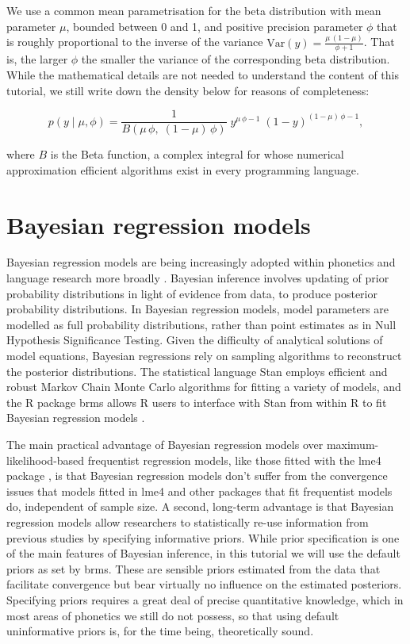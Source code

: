 \documentclass[
  authoryear,
  preprint,
  3p]{elsarticle}
\begin{document}
We use a common mean parametrisation for the beta distribution with mean
parameter \(\mu\), bounded between 0 and 1, and positive precision
parameter \(\phi\) that is roughly proportional to the inverse of the
variance \(\text{Var}(y) = \frac{\mu \, (1 - \mu)}{\phi + 1}\). That is,
the larger \(\phi\) the smaller the variance of the corresponding beta
distribution. While the mathematical details are not needed to
understand the content of this tutorial, we still write down the density
below for reasons of completeness:

\[
p(y \mid \mu, \phi) = \frac{1}{B(\mu \, \phi, \; (1-\mu) \, \phi)} \; y^{\mu \, \phi -1} \; (1-y)^{(1-\mu) \, \phi -1},
\]

where \(B\) is the Beta function, a complex integral for whose numerical
approximation efficient algorithms exist in every programming language.

\section{Bayesian regression models}\label{sec-bayes}

Bayesian regression models are being increasingly adopted within
phonetics and language research more broadly
\citep{vasishth2018, nalborczyk2019, verissimo2021}. Bayesian inference
involves updating of prior probability distributions in light of
evidence from data, to produce posterior probability distributions. In
Bayesian regression models, model parameters are modelled as full
probability distributions, rather than point estimates as in Null
Hypothesis Significance Testing. Given the difficulty of analytical
solutions of model equations, Bayesian regressions rely on sampling
algorithms to reconstruct the posterior distributions. The statistical
language Stan \citep{standevelopmentteam2017} employs efficient and
robust Markov Chain Monte Carlo algorithms for fitting a variety of
models, and the R package brms allows R users to interface with Stan
from within R to fit Bayesian regression models
\citep{burkner2017, burkner2018, burkner2021}.

The main practical advantage of Bayesian regression models over
maximum-likelihood-based frequentist regression models, like those
fitted with the lme4 package \citep{bates2015}, is that Bayesian
regression models don't suffer from the convergence issues that models
fitted in lme4 \citep{bates2015} and other packages
\citep{cribarineto2010} that fit frequentist models do, independent of
sample size. A second, long-term advantage is that Bayesian regression
models allow researchers to statistically re-use information from
previous studies by specifying informative priors. While prior
specification is one of the main features of Bayesian inference, in this
tutorial we will use the default priors as set by brms. These are
sensible priors estimated from the data that facilitate convergence but
bear virtually no influence on the estimated posteriors. Specifying
priors requires a great deal of precise quantitative knowledge, which in
most areas of phonetics we still do not possess, so that using default
uninformative priors is, for the time being, theoretically sound.
\end{document}
